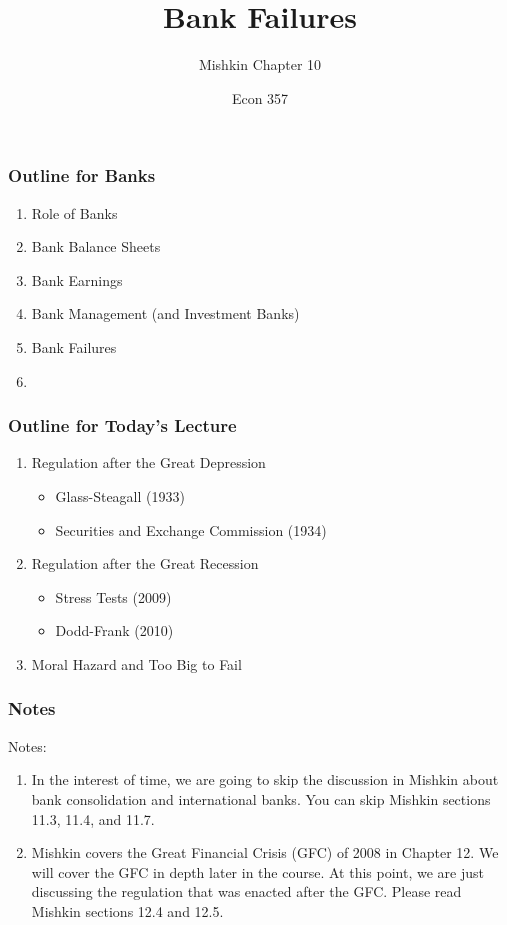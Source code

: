 \documentclass{beamer}
\title{Bank Failures}
\subtitle{Mishkin Chapter 10}
\author{Econ 357}
\date{\week}
\begin{document}
\frame{\titlepage}

\begin{frame}
    \frametitle{Outline for Banks}
        \begin{enumerate}
            \item Role of Banks
            \item Bank Balance Sheets
            \item Bank Earnings
            \item Bank Management (and Investment Banks)
            \item Bank Failures
            \item {}
        \end{enumerate}
\end{frame}


\begin{frame}
    \frametitle{Outline for Today's Lecture}
    
    \begin{enumerate}

        \item Regulation after the Great Depression
        \begin{itemize}
            \item Glass-Steagall (1933)
            \item Securities and Exchange Commission (1934)
        \end{itemize}
        \item Regulation after the Great Recession
        \begin{itemize}
            \item Stress Tests (2009)
            \item Dodd-Frank (2010)
        \end{itemize}
        \item Moral Hazard and Too Big to Fail
    \end{enumerate}

\end{frame}


\begin{frame}
\frametitle{Notes}

Notes:

    \begin{enumerate}
        \item In the interest of time, we are going to skip the discussion in Mishkin about bank consolidation and international banks.   You can skip Mishkin sections 11.3, 11.4, and 11.7.
        \item Mishkin covers the Great Financial Crisis (GFC) of 2008 in Chapter 12.   We will cover the GFC in depth later in the course.   At this point, we are just discussing the regulation that was enacted after the GFC.  Please read Mishkin sections 12.4 and 12.5.
    \end{enumerate}

\end{frame}
\end{document}
